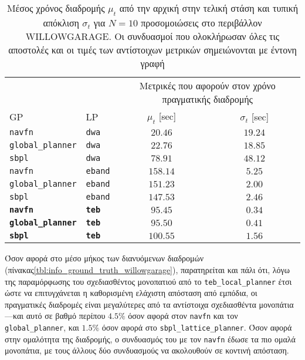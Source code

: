 \begin{table}[h]
\renewcommand{\arraystretch}{1.3}
\begin{tabular}{llcc}
  & & \multicolumn{2}{c}{Μετρικές που αφορούν στον χρόνο πραγματικής διαδρομής} \\
  \cline{3-4}
  GP & LP & $\mu_{t}$ [sec] & $\sigma_{t}$ [sec] \\  \toprule
  \texttt{navfn} & \texttt{dwa} & $20.46$ & $19.24$ \\
  \texttt{global\_planner} & \texttt{dwa} & $22.76$ & $18.85$ \\
  \texttt{sbpl} & \texttt{dwa} & $78.91$ & $48.12$ \\
  \texttt{navfn} & \texttt{eband} & $158.14$ & $5.25$ \\
  \texttt{global\_planner} & \texttt{eband} & $151.23$ & $2.00$ \\
  \texttt{sbpl} & \texttt{eband} & $147.53$ & $2.46$ \\
  \textbf{\texttt{navfn}} & \textbf{\texttt{teb}} & $\bm{95.45}$ & $\bm{0.34}$ \\
  \textbf{\texttt{global\_planner}} & \textbf{\texttt{teb}} & $\bm{95.50}$ & $\bm{0.41}$ \\
  \textbf{\texttt{sbpl}} & \textbf{\texttt{teb}} & $\bm{100.55}$ & $\bm{1.56}$ \\ \bottomrule
\end{tabular}
\caption{\small Μέσος χρόνος διαδρομής $\mu_{t}$ από την αρχική στην τελική
         στάση και τυπική απόκλιση $\sigma_{t}$ για $N=10$ προσομοιώσεις στο
         περιβάλλον WILLOWGARAGE. Οι συνδυασμοί που ολοκλήρωσαν όλες τις
         αποστολές και οι τιμές των αντίστοιχων μετρικών σημειώνονται με έντονη
         γραφή}
\label{tbl:info_pose_willowgarage}
\end{table}

Όσον αφορά στο μέσο μήκος των διανυόμενων διαδρομών
(πίνακας\ref{tbl:info_ground_truth_willowgarage}), παρατηρείται και πάλι ότι,
λόγω της παραμόρφωσης του σχεδιασθέντος μονοπατιού από το
\texttt{teb\_local\_planner} έτσι ώστε να επιτυγχάνεται η καθορισμένη ελάχιστη
απόσταση από εμπόδια, οι πραγματικές διαδρομές είναι μεγαλύτερες από τα
αντίστοιχα σχεδιασθέντα μονοπάτια---και αυτό σε βαθμό περίπου $4.5\%$ όσον
αφορά στον \texttt{navfn} και τον \texttt{global\_planner}, και $1.5\%$ όσον
αφορά στο \texttt{sbpl\_lattice\_planner}. Όσον αφορά στην ομαλότητα της
διαδρομής, ο συνδυασμός του με τον \texttt{navfn} έδωσε τα πιο ομαλά μονοπάτια,
με τους άλλους δύο συνδυασμούς να ακολουθούν σε κοντινή απόσταση.


